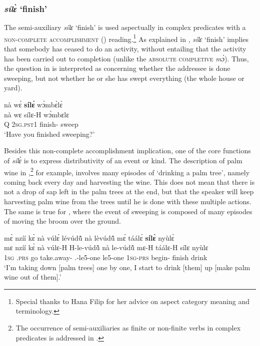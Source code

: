 \subsubsection*{{\itshape sílɛ̀} `finish'}
The semi-auxiliary {\itshape sílɛ} `finish' is used aspectually in complex predicates with a \textsc{non-complete accomplishment} ({\NCA}) reading.\footnote{Special thanks to Hana Filip for her advice on aspect category meaning and terminology.} As explained in , {\itshape sílɛ} `finish' implies that somebody has ceased to do an activity, without entailing that the activity has been carried out to completion (unlike the \textsc{absolute completive} {\itshape mɔ̀}). Thus, the question in  is interpreted as concerning whether the addressee is done sweeping, but not whether he or she has swept everything (the whole house or yard).

\ea\label{silea}
  \glll     nà wɛ̀ {\bfseries sílɛ́} wɔ̀mbɛ̀lɛ̀\\
           nà wɛ sílɛ-H wɔ̀mbɛlɛ \\
           Q 2\textsc{sg}.\textsc{pst}1 finish-{\R} sweep\\
    \trans `Have you finished sweeping?'
\z

Besides this non-complete accomplishment implication, one of  the core functions of {\itshape sílɛ̀} is to express distributivity of an event or kind. The description of palm wine in ,\footnote{The occurrence of semi-auxiliaries as finite or non-finite verbs in complex predicates is addressed in .} for example, involves many episodes of `drinking a palm tree', namely coming back every day and harvesting the wine. This does not mean that there is not a drop of sap left in the palm trees at the end, but that the speaker will keep harvesting palm wine from the trees until he is done with these multiple actions. The same is true for , where the event of sweeping is composed of many episodes of moving the broom over the ground.

\ea\label{sile1}
  \glll   mɛ̀ nzíí kɛ̀ nà vúlɛ́ lévúdũ̂ nà lèvúdũ̂ mɛ́ táálɛ́ {\bfseries sílɛ̀} nyùlɛ̀ \\
          mɛ nzíí kɛ̀ nà vúlɛ-H H-le-vúdũ̂ nà le-vúdũ̂ mɛ-H táálɛ-H sílɛ nyùlɛ \\
           1\textsc{sg} {\PROG}.\textsc{prs} go {\COM} take.away-{\R} {\OBJ}.{\LINK}-le5-one {\COM} le5-one 1\textsc{sg}-\textsc{prs} begin-{\R} finish drink\\
    \trans `I'm taking down [palm trees] one by one, I start to drink [them] up [make palm wine out of them].'
\z

